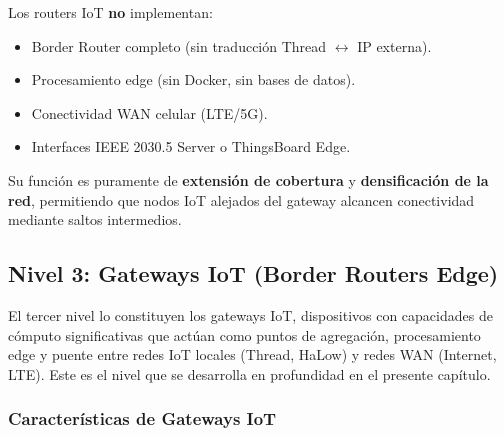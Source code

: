 Los routers IoT \textbf{no} implementan:
\begin{itemize}
    \item Border Router completo (sin traducción Thread $\leftrightarrow$ IP externa).
    \item Procesamiento edge (sin Docker, sin bases de datos).
    \item Conectividad WAN celular (LTE/5G).
    \item Interfaces IEEE 2030.5 Server o ThingsBoard Edge.
\end{itemize}

Su función es puramente de \textbf{extensión de cobertura} y \textbf{densificación de la red}, permitiendo que nodos IoT alejados del gateway alcancen conectividad mediante saltos intermedios.

\subsection{Nivel 3: Gateways IoT (Border Routers Edge)}

El tercer nivel lo constituyen los gateways IoT, dispositivos con capacidades de cómputo significativas que actúan como puntos de agregación, procesamiento edge y puente entre redes IoT locales (Thread, HaLow) y redes WAN (Internet, LTE). Este es el nivel que se desarrolla en profundidad en el presente capítulo.

\subsubsection{Características de Gateways IoT}

